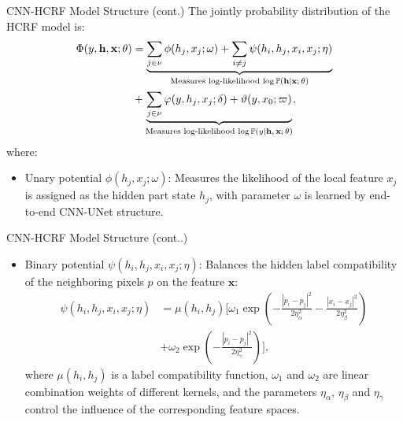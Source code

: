 \documentclass[leqno]{beamer}
\newcommand{\PP}{{\mathbb{P}}}
\newcommand{\hb}{\mathbf{h}}
\newcommand{\xb}{\mathbf{x}}
\begin{document}
\begin{frame}{CNN-HCRF Model Structure (cont.)}
The jointly probability distribution of the HCRF model is:
\begin{align*}
\Phi(y, \hb, \xb; \theta) &= \underbrace{
\sum_{j \in \nu} \phi(h_j, x_j; \omega) +
\sum_{i \neq j} \psi(h_i, h_j, x_i, x_j; \eta)}_{
\textrm{Measures log-likelihood $\log\PP(\hb \vert \xb; \theta)$}} \\
& + \underbrace{
\sum_{j \in \nu} \varphi(y, h_j, x_j; \delta) + \vartheta(y, x_0; \varpi)}_{
\textrm{Measures log-likelihood $\log\PP(y \vert \hb, \xb; \theta)$}},
\end{align*}
where:
\begin{itemize}
\item Unary potential $\phi(h_j, x_j; \omega)$: Measures the likelihood of the
local feature $x_j$ is assigned as the hidden part state $h_j$, with parameter
$\omega$ is learned by end-to-end CNN-UNet structure.
\end{itemize}
\end{frame}


\begin{frame}{CNN-HCRF Model Structure (cont..)}
\begin{itemize}
\item Binary potential $\psi(h_i, h_j, x_i, x_j; \eta)$: Balances the hidden
label compatibility of the neighboring pixels $p$ on the feature $\xb$:
\begin{align*}
\psi(h_i, h_j, x_i, x_j; \eta) &= \mu(h_i, h_j) \Bigg[
\omega_1 \exp \left(
-\frac{\left\lvert p_i - p_j \right\rvert^2}{2\eta_\alpha^2}
-\frac{\left\lvert x_i - x_j \right\rvert^2}{2\eta_\beta^2}
\right) \\
&+ \omega_2 \exp \left(
- \frac{\left\lvert p_i - p_j \right\rvert^2}{2 \eta_\gamma^2}
\right)
\Bigg],
\end{align*}
where $\mu(h_i, h_j)$ is a label compatibility function,
$\omega_1$ and $\omega_2$ are linear combination weights of different kernels,
and the parameters $\eta_\alpha$, $\eta_\beta$ and $\eta_\gamma$ control the
influence of the corresponding feature spaces.
\end{itemize}
\end{frame}
\end{document}
